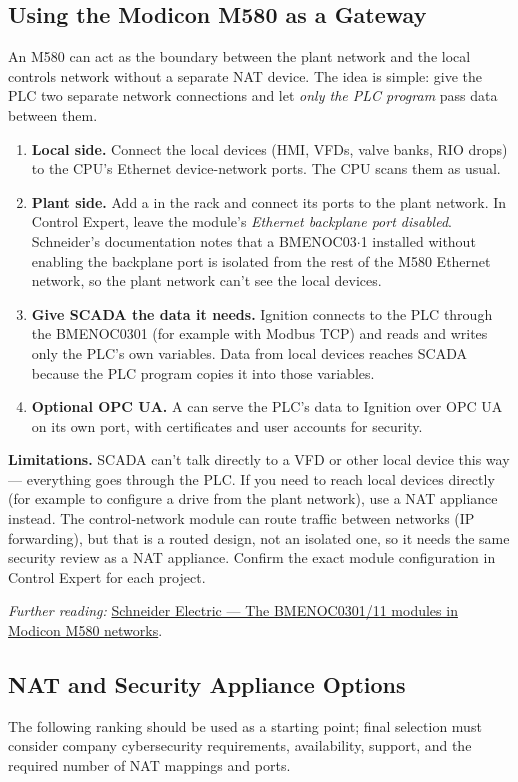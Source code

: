 \subsection{Using the Modicon M580 as a Gateway}\label{sec:m580-gateway}
An M580 can act as the boundary between the plant network and the local controls network without a separate NAT device. The idea is simple: give the PLC two separate network connections and let \emph{only the PLC program} pass data between them.
\begin{enumerate}[itemsep=2pt]
  \item \textbf{Local side.} Connect the local devices (HMI, VFDs, valve banks, RIO drops) to the CPU's Ethernet device-network ports. The CPU scans them as usual.
  \item \textbf{Plant side.} Add a  in the rack and connect its ports to the plant network. In Control Expert, leave the module's \emph{Ethernet backplane port disabled}. Schneider's documentation notes that a BMENOC03$\cdot$1 installed without enabling the backplane port is isolated from the rest of the M580 Ethernet network, so the plant network can't see the local devices.
  \item \textbf{Give SCADA the data it needs.} Ignition connects to the PLC through the BMENOC0301 (for example with Modbus TCP) and reads and writes only the PLC's own variables. Data from local devices reaches SCADA because the PLC program copies it into those variables.
  \item \textbf{Optional OPC UA.} A  can serve the PLC's data to Ignition over OPC UA on its own port, with certificates and user accounts for security.
\end{enumerate}
\textbf{Limitations.} SCADA can't talk directly to a VFD or other local device this way --- everything goes through the PLC. If you need to reach local devices directly (for example to configure a drive from the plant network), use a NAT appliance instead. The  control-network module can route traffic between networks (IP forwarding), but that is a routed design, not an isolated one, so it needs the same security review as a NAT appliance. Confirm the exact module configuration in Control Expert for each project.

\textit{Further reading:} \href{https://filedn.eu/l6oFb0aAwOAyRLLaUMiUmzz/CE_HELP/eng/BMENOC03x1/BMENOC03x1_D-SE-0035359.htm}{Schneider Electric --- The BMENOC0301/11 modules in Modicon M580 networks}.

\subsection{NAT and Security Appliance Options}
The following ranking should be used as a starting point; final selection must consider company cybersecurity requirements, availability, support, and the required number of NAT mappings and ports.

